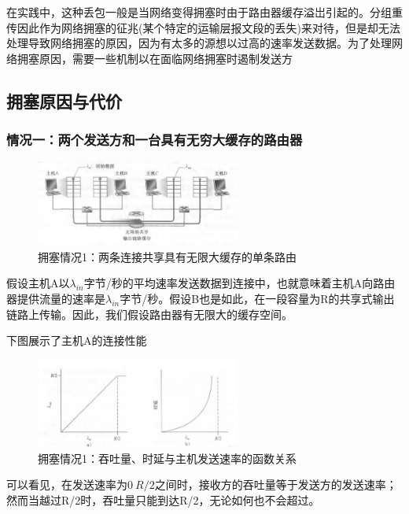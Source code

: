     在实践中，这种丢包一般是当网络变得拥塞时由于路由器缓存溢岀引起的。分组重传因此作为网络拥塞的征兆(某个特定的运输层报文段的丢失)来对待，但是却无法处理导致网络拥塞的原因，因为有太多的源想以过高的速率发送数据。为了处理网络拥塞原因，需要一些机制以在面临网络拥塞时遏制发送方

\subsection{拥塞原因与代价}

\subsubsection{情况一：两个发送方和一台具有无穷大缓存的路由器}

\begin{figure}[!htbp]
    \centering
    \includegraphics[width=0.6\textwidth]{image/chapter03/拥塞情况一.png}
    \caption{拥塞情况1：两条连接共享具有无限大缓存的单条路由}
\end{figure}

    假设主机A以$\lambda_{in}$字节/秒的平均速率发送数据到连接中，也就意味着主机A向路由器提供流量的速率是$\lambda_{in}$字节/秒。假设B也是如此，在一段容量为R的共享式输出链路上传输。因此，我们假设路由器有无限大的缓存空间。

    下图展示了主机A的连接性能

\begin{figure}[!htbp]
    \centering
    \includegraphics[width=0.6\textwidth]{image/chapter03/拥塞情况一吞吐量与延时等关系.png}
    \caption{拥塞情况1：吞吐量、时延与主机发送速率的函数关系}
\end{figure}

    可以看见，在发送速率为$0 ~ R/2$之间时，接收方的吞吐量等于发送方的发送速率；然而当越过R/2时，吞吐量只能到达R/2，无论如何也不会超过。

